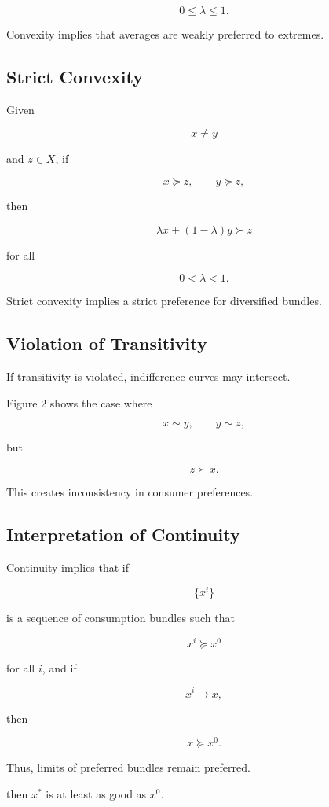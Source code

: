 \[
0 \le \lambda \le 1.
\]

Convexity implies that averages are weakly preferred to extremes.

\subsection{Strict Convexity}

Given

\[
x \ne y
\]

and \(z \in X\), if

\[
x \succeq z,
\qquad
y \succeq z,
\]

then

\[
\lambda x + (1-\lambda)y \succ z
\]

for all

\[
0 < \lambda < 1.
\]

Strict convexity implies a strict preference for diversified bundles.

\subsection{Violation of Transitivity}

If transitivity is violated, indifference curves may intersect.

Figure 2 shows the case where

\[
x \sim y,
\qquad
y \sim z,
\]

but

\[
z \succ x.
\]

This creates inconsistency in consumer preferences.

\subsection{Interpretation of Continuity}

Continuity implies that if

\[
\{x^i\}
\]

is a sequence of consumption bundles such that

\[
x^i \succeq x^0
\]

for all \(i\), and if

\[
x^i \to x,
\]

then

\[
x \succeq x^0.
\]

Thus, limits of preferred bundles remain preferred.



then \(x^*\) is at least as good as \(x^0\).

